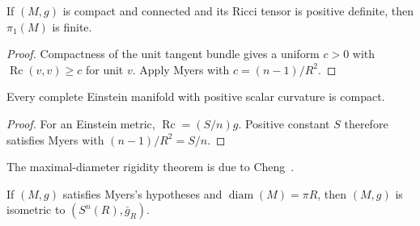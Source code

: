 \begin{corollary}
\label{cor:positive-ricci-finite-fundamental-group}
If $(M,g)$ is compact and connected and its Ricci tensor is positive definite,
then $\pi_1(M)$ is finite.
\end{corollary}

\begin{proof}
\sketch
Compactness of the unit tangent bundle gives a uniform $c>0$ with
$\operatorname{Rc}(v,v)\geq c$ for unit $v$.  Apply Myers with
$c=(n-1)/R^2$.
\end{proof}

\begin{corollary}
\label{cor:einstein-positive-scalar-curvature-compact}
Every complete Einstein manifold with positive scalar curvature is compact.
\end{corollary}

\begin{proof}
\sketch
For an Einstein metric, $\operatorname{Rc}=(S/n)g$.  Positive constant $S$
therefore satisfies Myers with $(n-1)/R^2=S/n$.
\end{proof}

The maximal-diameter rigidity theorem is due to Cheng~\cite{Che75}.

\begin{theorem}
\label{thm:chengs-maximal-diameter}
If $(M,g)$ satisfies Myers's hypotheses and
$\operatorname{diam}(M)=\pi R$, then $(M,g)$ is isometric to
$(S^n(R),\bar g_R)$.
\end{theorem}

